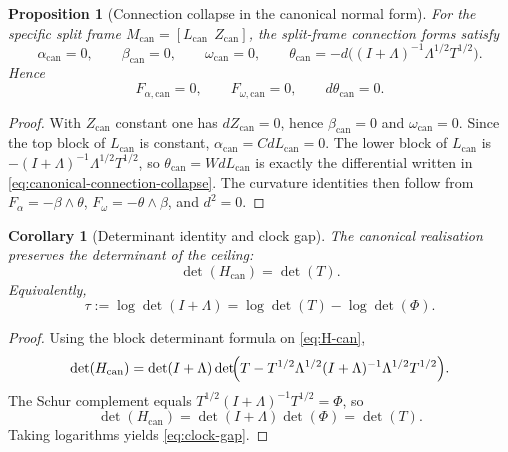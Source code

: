 \documentclass[11pt,a4paper]{article}
\numberwithin{equation}{section}
\theoremstyle{thmcompact}
\newtheorem{proposition}[theorem]{Proposition}
\newtheorem{corollary}[theorem]{Corollary}
\theoremstyle{remark}
\begin{document}
\begin{proposition}[Connection collapse in the canonical normal form]
\label{prop:canonical-connection}
For the specific split frame $M_{\mathrm{can}}=[L_{\mathrm{can}}\ \ Z_{\mathrm{can}}]$, the split-frame connection forms satisfy
\begin{equation}
\alpha_{\mathrm{can}}=0,
\qquad
\beta_{\mathrm{can}}=0,
\qquad
\omega_{\mathrm{can}}=0,
\qquad
\theta_{\mathrm{can}}=-d\!\bigl((I+\Lambda)^{-1}\Lambda^{1/2}T^{1/2}\bigr).
\label{eq:canonical-connection-collapse}
\end{equation}
Hence
\begin{equation}
F_{\alpha,\mathrm{can}}=0,
\qquad
F_{\omega,\mathrm{can}}=0,
\qquad
d\theta_{\mathrm{can}}=0.
\label{eq:canonical-curvature-zero}
\end{equation}
\end{proposition}

\begin{proof}
With $Z_{\mathrm{can}}$ constant one has $dZ_{\mathrm{can}}=0$, hence $\beta_{\mathrm{can}}=0$ and $\omega_{\mathrm{can}}=0$. Since the top block of $L_{\mathrm{can}}$ is constant, $\alpha_{\mathrm{can}}=CdL_{\mathrm{can}}=0$. The lower block of $L_{\mathrm{can}}$ is $-(I+\Lambda)^{-1}\Lambda^{1/2}T^{1/2}$, so $\theta_{\mathrm{can}}=WdL_{\mathrm{can}}$ is exactly the differential written in \eqref{eq:canonical-connection-collapse}. The curvature identities then follow from $F_\alpha=-\beta\wedge\theta$, $F_\omega=-\theta\wedge\beta$, and $d^2=0$.
\end{proof}

\begin{corollary}[Determinant identity and clock gap]
\label{cor:canonical-determinant}
The canonical realisation preserves the determinant of the ceiling:
\begin{equation}
\det(H_{\mathrm{can}})=\det(T).
\label{eq:det-H-can}
\end{equation}
Equivalently,
\begin{equation}
\tau:=\log\det(I+\Lambda)=\log\det(T)-\log\det(\Phi).
\label{eq:clock-gap}
\end{equation}
\end{corollary}

\begin{proof}
Using the block determinant formula on \eqref{eq:H-can},
\[
\det(H_{\mathrm{can}})=\det(I+\Lambda)\det\!\Bigl(T-T^{1/2}\Lambda^{1/2}(I+\Lambda)^{-1}\Lambda^{1/2}T^{1/2}\Bigr).
\]
The Schur complement equals $T^{1/2}(I+\Lambda)^{-1}T^{1/2}=\Phi$, so
\[
\det(H_{\mathrm{can}})=\det(I+\Lambda)\det(\Phi)=\det(T).
\]
Taking logarithms yields \eqref{eq:clock-gap}.
\end{proof}
\end{document}

